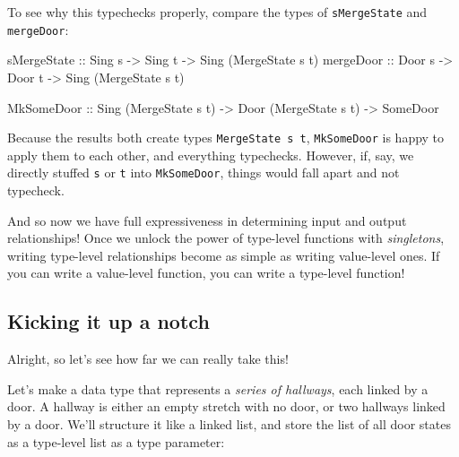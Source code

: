 \documentclass[]{article}
\newenvironment{Shaded}{}{}
\newcommand{\DataTypeTok}[1]{\textcolor[rgb]{0.56,0.13,0.00}{#1}}
\newcommand{\NormalTok}[1]{#1}
\newcommand{\OtherTok}[1]{\textcolor[rgb]{0.00,0.44,0.13}{#1}}
\begin{document}
To see why this typechecks properly, compare the types of \texttt{sMergeState}
and \texttt{mergeDoor}:

\begin{Shaded}
\begin{Highlighting}[]
\OtherTok{sMergeState ::} \DataTypeTok{Sing}\NormalTok{ s }\OtherTok{->} \DataTypeTok{Sing}\NormalTok{ t }\OtherTok{->} \DataTypeTok{Sing}\NormalTok{ (}\DataTypeTok{MergeState}\NormalTok{ s t)}
\OtherTok{mergeDoor   ::} \DataTypeTok{Door}\NormalTok{ s }\OtherTok{->} \DataTypeTok{Door}\NormalTok{ t }\OtherTok{->} \DataTypeTok{Sing}\NormalTok{ (}\DataTypeTok{MergeState}\NormalTok{ s t)}

\DataTypeTok{MkSomeDoor}\OtherTok{  ::} \DataTypeTok{Sing}\NormalTok{ (}\DataTypeTok{MergeState}\NormalTok{ s t) }\OtherTok{->} \DataTypeTok{Door}\NormalTok{ (}\DataTypeTok{MergeState}\NormalTok{ s t) }\OtherTok{->} \DataTypeTok{SomeDoor}
\end{Highlighting}
\end{Shaded}

Because the results both create types \texttt{MergeState\ s\ t},
\texttt{MkSomeDoor} is happy to apply them to each other, and everything
typechecks. However, if, say, we directly stuffed \texttt{s} or \texttt{t} into
\texttt{MkSomeDoor}, things would fall apart and not typecheck.

And so now we have full expressiveness in determining input and output
relationships! Once we unlock the power of type-level functions with
\emph{singletons}, writing type-level relationships become as simple as writing
value-level ones. If you can write a value-level function, you can write a
type-level function!

\hypertarget{kicking-it-up-a-notch}{%
\subsection{Kicking it up a notch}\label{kicking-it-up-a-notch}}

Alright, so let's see how far we can really take this!

Let's make a data type that represents a \emph{series of hallways}, each linked
by a door. A hallway is either an empty stretch with no door, or two hallways
linked by a door. We'll structure it like a linked list, and store the list of
all door states as a type-level list as a type parameter:
\end{document}
